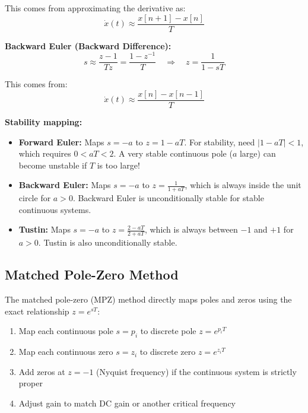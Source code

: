 This comes from approximating the derivative as:
\begin{equation}
\dot{x}(t) \approx \frac{x[n+1] - x[n]}{T}
\end{equation}

\textbf{Backward Euler (Backward Difference):}
\begin{equation}
s \approx \frac{z-1}{Tz} = \frac{1 - z^{-1}}{T} \quad \Rightarrow \quad z = \frac{1}{1-sT}
\label{eq:backward_euler}
\end{equation}

This comes from:
\begin{equation}
\dot{x}(t) \approx \frac{x[n] - x[n-1]}{T}
\end{equation}

\textbf{Stability mapping:}

\begin{itemize}
    \item \textbf{Forward Euler:} Maps $s = -a$ to $z = 1 - aT$. For stability, need $|1-aT| < 1$, which requires $0 < aT < 2$. A very stable continuous pole ($a$ large) can become unstable if $T$ is too large!

    \item \textbf{Backward Euler:} Maps $s = -a$ to $z = \frac{1}{1+aT}$, which is always inside the unit circle for $a > 0$. Backward Euler is unconditionally stable for stable continuous systems.

    \item \textbf{Tustin:} Maps $s = -a$ to $z = \frac{2-aT}{2+aT}$, which is always between $-1$ and $+1$ for $a > 0$. Tustin is also unconditionally stable.
\end{itemize}


\subsection{Matched Pole-Zero Method}

The matched pole-zero (MPZ) method directly maps poles and zeros using the exact relationship $z = e^{sT}$:

\begin{enumerate}
    \item Map each continuous pole $s = p_i$ to discrete pole $z = e^{p_i T}$
    \item Map each continuous zero $s = z_i$ to discrete zero $z = e^{z_i T}$
    \item Add zeros at $z = -1$ (Nyquist frequency) if the continuous system is strictly proper
    \item Adjust gain to match DC gain or another critical frequency
\end{enumerate}

